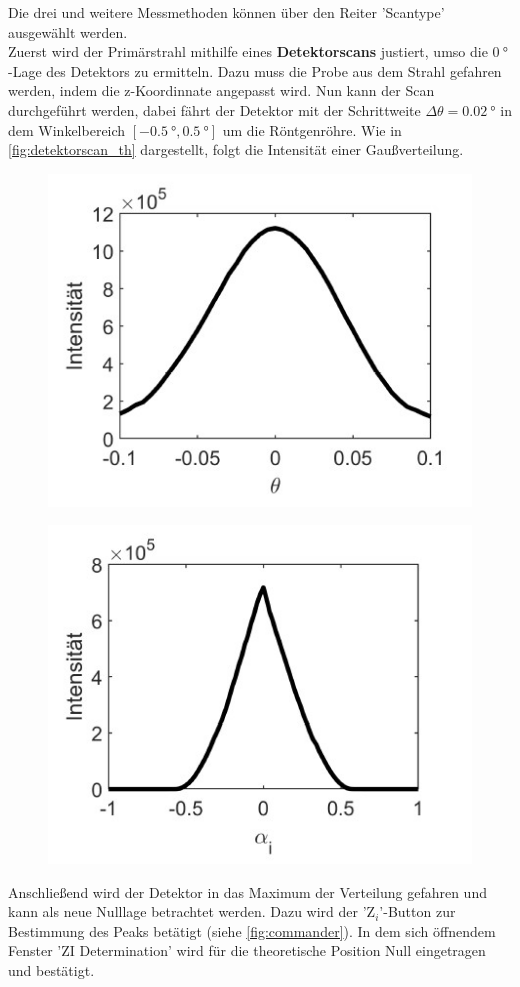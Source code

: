 Die drei und weitere Messmethoden können über den Reiter 'Scantype' ausgewählt werden.
\\
Zuerst wird der Primärstrahl mithilfe eines \textbf{Detektorscans} justiert, umso die $\SI{0}{\degree}$-Lage des Detektors zu ermitteln.
Dazu muss die Probe aus dem Strahl gefahren werden, indem die z-Koordinnate angepasst wird.
Nun kann der Scan durchgeführt werden, dabei fährt der Detektor mit der Schrittweite $\Delta \theta = \SI{0.02}{\degree}$ in dem Winkelbereich $[\SI{-0.5}{\degree}, \SI{0.5}{\degree}]$ um die Röntgenröhre.
Wie in \autoref{fig:detektorscan_th} dargestellt, folgt die Intensität einer Gaußverteilung.
\begin{figure}
    \centering
    \begin{minipage}{.5\textwidth}
      \centering
      \includegraphics[width=.4\linewidth]{content/data/detektorscan.jpg}
      \label{fig:detektorscan_th}
    \end{minipage}%
    \begin{minipage}{.5\textwidth}
      \centering
      \includegraphics[width=.4\linewidth]{content/data/rockingscan.jpg}
      \label{fig:rockingscan_th}
    \end{minipage}
\end{figure}
Anschließend wird der Detektor in das Maximum der Verteilung gefahren und kann als neue Nulllage betrachtet werden.
Dazu wird der '$\mathrm{Z}_i$'-Button zur Bestimmung des Peaks betätigt (siehe \autoref{fig:commander}).
In dem sich öffnendem Fenster 'ZI Determination' wird für die theoretische Position Null eingetragen und bestätigt.
